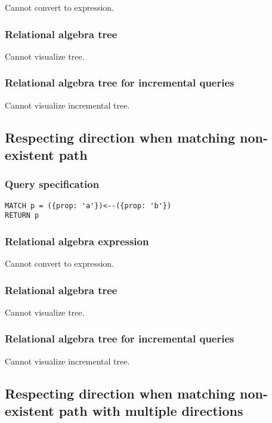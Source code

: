 Cannot convert to expression.

\subsubsection*{Relational algebra tree}

Cannot visualize tree.

\subsubsection*{Relational algebra tree for incremental queries}

Cannot visualize incremental tree.

\subsection{Respecting direction when matching non-existent path}

\subsubsection*{Query specification}

\begin{lstlisting}
MATCH p = ({prop: 'a'})<--({prop: 'b'})
RETURN p
\end{lstlisting}

\subsubsection*{Relational algebra expression}

Cannot convert to expression.

\subsubsection*{Relational algebra tree}

Cannot visualize tree.

\subsubsection*{Relational algebra tree for incremental queries}

Cannot visualize incremental tree.

\subsection{Respecting direction when matching non-existent path with multiple directions}

